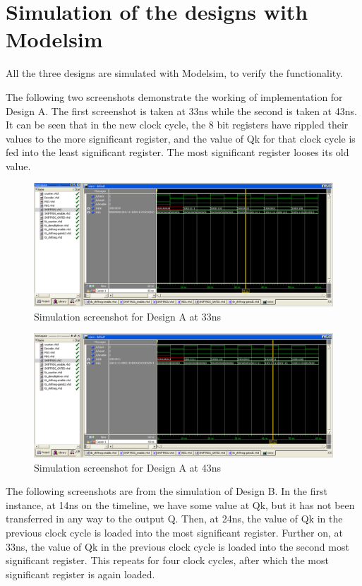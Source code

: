 \documentclass[11pt,a4paper]{article}
\begin{document}
\newpage
\section{Simulation of the designs with Modelsim}
\label{section:simulation}
All the three designs are simulated with Modelsim, to verify the functionality.
 
The following two screenshots demonstrate the working of implementation for Design A. The first screenshot is taken at 33ns while the second is taken at 43ns. It can be seen that in the new clock cycle, the 8 bit registers have rippled their values to the more significant register, and the value of Qk for that clock cycle is fed into the least significant register. The most significant register looses its old value.

\begin{figure}[htp]
\centering
\includegraphics[length = 4in,width = 6.5in]{./images/simsr1.png}
\caption{Simulation screenshot for Design A at 33ns}
\end{figure}

\begin{figure}[htp]
\centering
\includegraphics[length = 4in,width = 6.5in]{./images/simsr2.png}
\caption{Simulation screenshot for Design A at 43ns}
\end{figure}

\newpage
The following screenshots are from the simulation of Design B. In the first instance, at 14ns on the timeline, we have some value at Qk, but it has not been transferred in any way to the output Q. Then, at 24ns, the value of Qk in the previous clock cycle is loaded into the most significant register. Further on, at 33ns, the value of Qk in the previous clock cycle is loaded into the second most significant register. This repeats for four clock cycles, after which the most significant register is again loaded.
\end{document}
